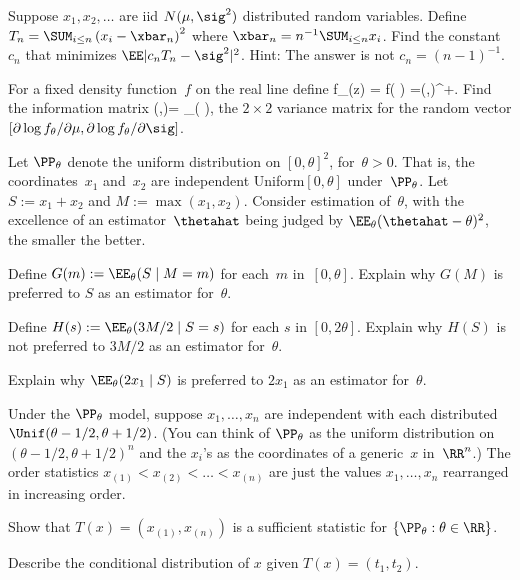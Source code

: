 \documentclass[11pt,letterpaper,leqno,oneside,fleqn]{book}
\begin{document}

\problem[MSE]
Suppose $x_1,x_2,\dots$ are iid $N(\mu,\sig^2)$ distributed random variables.  Define $T_n=\SUM_{i\le n}\left( x_i-\xbar_n\right)^2$ where $\xbar_n= n^{-1}\SUM_{i\le n}x_i$.
Find the constant~$c_n$ that minimizes $\EE|c_n T_n-\sig^2|^2$.  Hint:  The answer is not $c_n= (n-1)^{-1}$.

\problem[Fisher]
For a fixed density function~$f$ on the real line define
\beqN
f_{\theta}(z) = \sig f\left( \right)
\theta=(\mu,\sig)\in \RR\times \RR^+.
\eeqN
Find the information matrix
\beqN
\II(\mu,\sig)= \var_{\theta}\left( \right),
\eeqN
the $2\times 2$ variance matrix for the random vector
$[\partial\log f_\theta/\partial \mu, \partial\log f_\theta/\partial\sig]$.



\problem[suff]
Let $\PP_\theta$ denote the uniform distribution on $[0,\theta]^2$, for~$\theta>0$.  That
is, the coordinates~$x_1$ and~$x_2$ are independent Uniform$[0,\theta]$
under~$\PP_\theta$.  Let
$S :=x_1+x_2$ and $M :=\max(x_1,x_2)$. Consider estimation of~$\theta$, with the 
excellence of an estimator~$\thetahat$ being judged by $\EE_\theta(\thetahat-\theta)^2$, the smaller the better.

\ppart
Define $G(m):=\EE_\theta(S\mid M=m)$ for each~$m$ in~$[0,\theta]$.  Explain why $G(M)$ is
preferred to
$S$ as an  estimator for~$\theta$.

\ppart
Define $H(s) :=\EE_\theta(3M/2\mid S=s)$ for each $s$ in $[0,2\theta]$.
Explain why $H(S)$ is not preferred to $3M/2$ as an  estimator for~$\theta$.

\ppart
Explain why $\EE_\theta(2x_1\mid S)$ is preferred to $2x_1$
as an  estimator for~$\theta$.



\problem[unif]
Under the $\PP_\theta$ model, suppose $x_1,\dots, x_n$ are independent with each distributed $\Unif(\theta-1/2,\theta+1/2)$.  (You can think of $\PP_\theta$ as the uniform distribution on~$(\theta-1/2,\theta+1/2)^n$ and the $x_i$'s as the coordinates of a generic~$x$ in~$\RR^n$.)
The order statistics $x_{(1)} < x_{(2)}< \dots < x_{(n)}$ are just the values $x_1,\dots,x_n$ rearranged in increasing order.

\ppart
Show that $T(x)=(x_{(1)},x_{(n)})$ is a  sufficient statistic for $\{\PP_\theta:\theta \in \RR\}$.

\ppart
Describe the conditional distribution of $x$ given $T(x)=(t_1,t_2)$.
\end{document}
